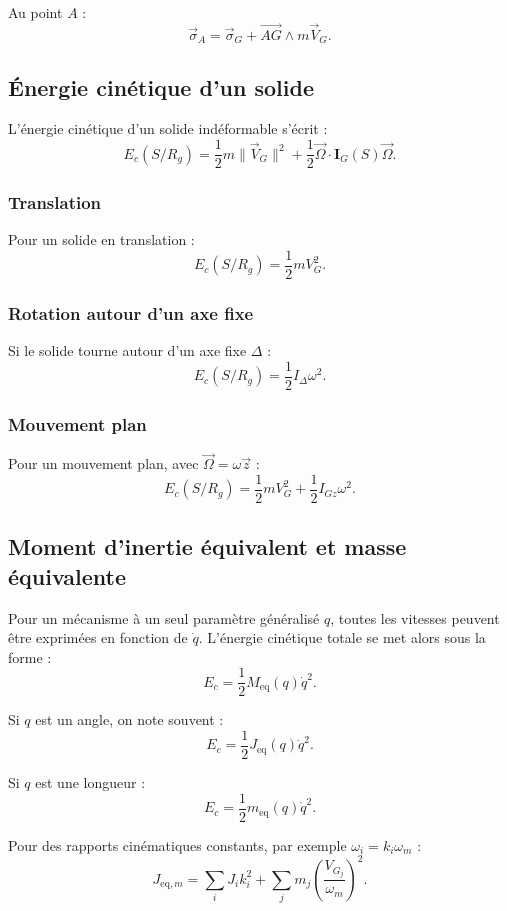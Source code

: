 Au point $A$ :
\[
\vec\sigma_A=\vec\sigma_G+\overrightarrow{AG}\wedge m\vec V_G.
\]

\subsection{Énergie cinétique d'un solide}

L'énergie cinétique d'un solide indéformable s'écrit :
\[
E_c(S/R_g)=
\frac12 m\|\vec V_G\|^2
+\frac12\vec\Omega\cdot\mathbf I_G(S)\vec\Omega.
\]

\subsubsection{Translation}

Pour un solide en translation :
\[
E_c(S/R_g)=\frac12 mV_G^2.
\]

\subsubsection{Rotation autour d'un axe fixe}

Si le solide tourne autour d'un axe fixe $\Delta$ :
\[
E_c(S/R_g)=\frac12 I_\Delta\omega^2.
\]

\subsubsection{Mouvement plan}

Pour un mouvement plan, avec $\vec\Omega=\omega\vec z$ :
\[
E_c(S/R_g)=\frac12 mV_G^2+\frac12 I_{Gz}\omega^2.
\]

\subsection{Moment d'inertie équivalent et masse équivalente}

Pour un mécanisme à un seul paramètre généralisé $q$, toutes les vitesses peuvent être exprimées en fonction de $\dot q$. L'énergie cinétique totale se met alors sous la forme :
\[
E_c=\frac12 M_{\mathrm{eq}}(q)\dot q^2.
\]

Si $q$ est un angle, on note souvent :
\[
E_c=\frac12 J_{\mathrm{eq}}(q)\dot q^2.
\]

Si $q$ est une longueur :
\[
E_c=\frac12 m_{\mathrm{eq}}(q)\dot q^2.
\]

Pour des rapports cinématiques constants, par exemple $\omega_i=k_i\omega_m$ :
\[
J_{\mathrm{eq},m}=\sum_i J_i k_i^2
+\sum_j m_j\left(\frac{V_{G_j}}{\omega_m}\right)^2.
\]

